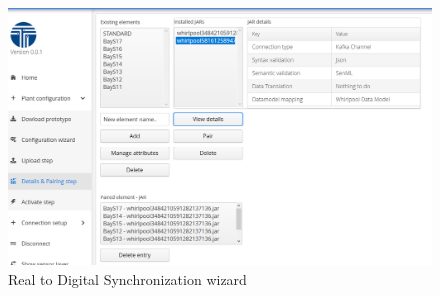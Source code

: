 \begin{figure}
  \includegraphics[width=\linewidth]{images/wizard.PNG}
  \caption{Real to Digital Synchronization wizard}
  \label{fig:wizard}
\end{figure}
